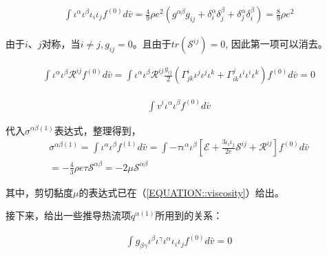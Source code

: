 \documentclass[LBMDerivation.tex]{subfiles}
\begin{document}
\begin{equation}
  \begin{gathered}
    \int \iota^\alpha \iota^\beta \iota_i \iota_j  f^{(0)}  d \bar{v}=\frac{4}{9}\rho e^2 (g^{\alpha \beta}g_{ij}+\delta^{\alpha}_i \delta^{\beta}_j+\delta^{\alpha}_j \delta^{\beta}_i)=\frac{8}{9}\rho e^2
  \end{gathered}
\end{equation}

由于$i$、$j$对称，当$i\neq j,g_{ij}=0$。且由于$tr(\mathcal{S}^{ij})=0$, 因此第一项可以消去。

\begin{equation}
  \begin{gathered}
    \int \iota^\alpha \iota^\beta \mathcal{R}^{ij} f^{(0)}   d \bar{v}= \int \iota^\alpha \iota^\beta \mathcal{R}^{ij}  \frac{g_{ij}}{2}(\Gamma_{jk}^i \iota^j\iota^j\iota^k + \Gamma_{ik}^j \iota^i\iota^i\iota^k ) f^{(0)}  d \bar{v} =0
  \end{gathered}
\end{equation}

\begin{equation}
  \begin{gathered}
    \int v^i \iota^\alpha \iota^\beta  f^{(0)} d \bar{v}
  \end{gathered}
\end{equation}

代入$\sigma^{\alpha\beta(1)}$表达式，整理得到，
\begin{equation}
  \begin{gathered}
    \sigma^{\alpha\beta(1)}=\int \iota^{\alpha} \iota^{\beta} f^{(1)}  d \bar{v}= \int  -\tau \iota^\alpha \iota^\beta [ \mathcal{E}
      +\frac{3\iota_i \iota_j}{2e} \mathcal{S}^{ij}
      +  \mathcal{R}^{ij}
    ]{f^{(0)}} d \bar{v} \\
    = - \frac{4}{3} \rho e \tau  \mathcal{S}^{\alpha\beta} =  -2 \mu \mathcal{S}^{\alpha\beta}
  \end{gathered}
\end{equation}

其中，剪切黏度$\mu$的表达式已在（\ref{EQUATION::viscosity}）给出。


接下来，给出一些推导热流项$q^{\alpha (1)}$所用到的关系：

\begin{equation}
  \begin{gathered}
    \int g_{\beta\gamma} \iota^{\beta} \iota^{\gamma}  \iota^{\alpha} \iota_i \iota_j  f^{(0)}  d \bar{v} =0
  \end{gathered}
\end{equation}
\end{document}

